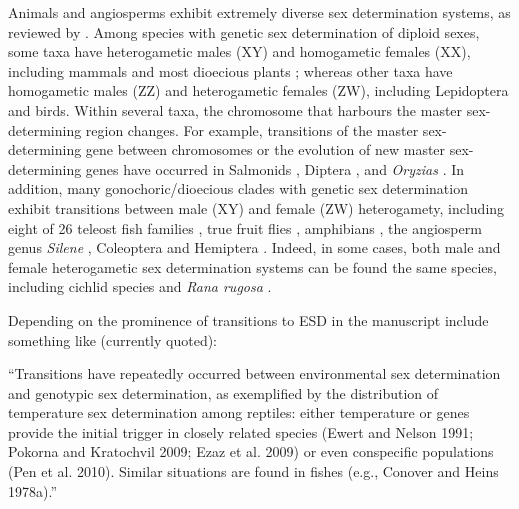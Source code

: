 \documentclass[12pt]{article}
\begin{document}

Animals and angiosperms exhibit extremely diverse sex determination systems, as reviewed by \citet{Bull:1983vi,Charlesworth:2010it,Beukeboom:2014vb,Bachtrog:2014bx}. 
Among species with genetic sex determination of diploid sexes, some taxa have heterogametic males (XY) and homogametic females (XX), including %
mammals and most dioecious plants \citep{Ming:2011iy}; whereas other taxa have homogametic males (ZZ) and heterogametic females (ZW), including Lepidoptera and birds. 
Within several taxa, the chromosome that harbours the master sex-determining region changes. 
For example, transitions of the master sex-determining gene between chromosomes or the evolution of new master sex-determining genes have occurred in Salmonids \citep{Li:2011fm,Yano:2012di}, Diptera \citep{Vicoso:2015hf}, and \textit{Oryzias} \citep{Myosho:2012fv}.
In addition, many gonochoric/dioecious clades with genetic sex determination exhibit transitions between male (XY) and female (ZW) heterogamety, including eight of 26 teleost fish families \citep{Mank:2006bt}, true fruit flies \citep[Tephritids,][]{Vicoso:2015hf}, amphibians \citep{Hillis:1990gu}, the angiosperm genus \textit{Silene} \citep{Slancarova:2013dq}, Coleoptera and Hemiptera \citep[][plate 2]{Beukeboom:2014vb}.
Indeed, in some cases, both male and female heterogametic sex determination systems can be found the same species, including cichlid species \citep{Ser:2010iq} and \textit{Rana rugosa} \citep{Ogata:2007jm}.

\noindent
Depending on the prominence of transitions to ESD in the manuscript include something like (currently quoted):

``Transitions have repeatedly occurred between environmental sex determination and genotypic sex determination, as exemplified by the distribution of temperature sex determination among reptiles: either temperature or genes provide the initial trigger in closely related species (Ewert and Nelson 1991; Pokorna and Kratochvil 2009; Ezaz et al. 2009) or even conspecific populations (Pen et al. 2010). Similar situations are found in fishes (e.g., Conover and Heins 1978a).''
\end{document}
